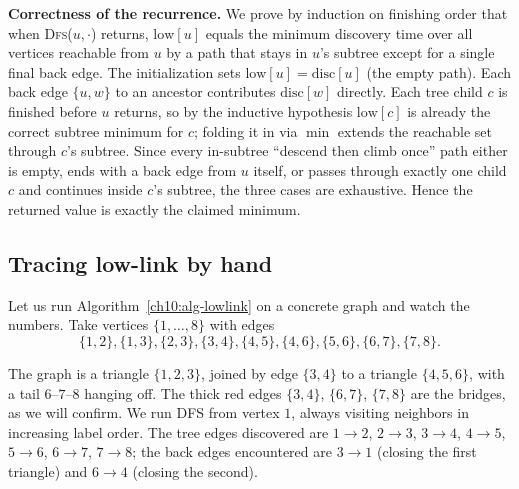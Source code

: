 \begin{whybox}
\textbf{Correctness of the recurrence.} We prove by induction on finishing order that
when \textsc{Dfs}($u,\cdot$) returns, $\mathrm{low}[u]$ equals the minimum discovery
time over all vertices reachable from $u$ by a path that stays in $u$'s subtree except
for a single final back edge. The initialization sets $\mathrm{low}[u]=\mathrm{disc}[u]$
(the empty path). Each back edge $\{u,w\}$ to an ancestor contributes $\mathrm{disc}[w]$
directly. Each tree child $c$ is finished before $u$ returns, so by the inductive
hypothesis $\mathrm{low}[c]$ is already the correct subtree minimum for $c$; folding it
in via $\min$ extends the reachable set through $c$'s subtree. Since every in-subtree
``descend then climb once'' path either is empty, ends with a back edge from $u$
itself, or passes through exactly one child $c$ and continues inside $c$'s subtree, the
three cases are exhaustive. Hence the returned value is exactly the claimed minimum.
\end{whybox}

\subsection{Tracing low-link by hand}
\label{ch10:trace}

Let us run Algorithm~\ref{ch10:alg-lowlink} on a concrete graph and watch the numbers.
Take vertices $\{1,\dots,8\}$ with edges
\[
  \{1,2\},\{1,3\},\{2,3\},\{3,4\},\{4,5\},\{4,6\},\{5,6\},\{6,7\},\{7,8\}.
\]

\begin{center}
\end{center}

The graph is a triangle $\{1,2,3\}$, joined by edge $\{3,4\}$ to a triangle
$\{4,5,6\}$, with a tail $6$--$7$--$8$ hanging off. The thick red edges
$\{3,4\}$, $\{6,7\}$, $\{7,8\}$ are the bridges, as we will confirm. We run DFS from
vertex $1$, always visiting neighbors in increasing label order. The tree edges
discovered are $1\!\to\!2$, $2\!\to\!3$, $3\!\to\!4$, $4\!\to\!5$, $5\!\to\!6$,
$6\!\to\!7$, $7\!\to\!8$; the back edges encountered are $3\!\to\!1$ (closing the first
triangle) and $6\!\to\!4$ (closing the second).

